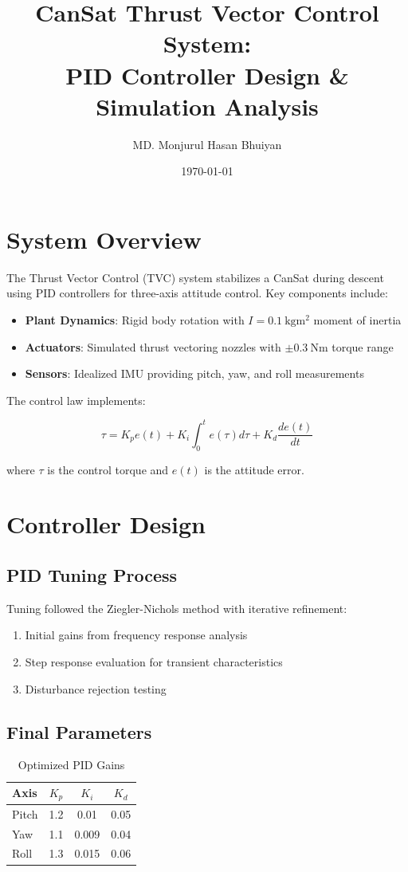 \documentclass[a4paper,12pt]{article}
\title{CanSat Thrust Vector Control System: \\ PID Controller Design \& Simulation Analysis}
\author{MD. Monjurul Hasan Bhuiyan}
\date{\today}
\begin{document}
\maketitle

\section{System Overview}
The Thrust Vector Control (TVC) system stabilizes a CanSat during descent using PID controllers for three-axis attitude control. Key components include:

\begin{itemize}
\item \textbf{Plant Dynamics}: Rigid body rotation with $I = \SI{0.1}{\kilo\gram\meter\squared}$ moment of inertia
\item \textbf{Actuators}: Simulated thrust vectoring nozzles with $\pm\SI{0.3}{\newton\meter}$ torque range
\item \textbf{Sensors}: Idealized IMU providing pitch, yaw, and roll measurements
\end{itemize}

The control law implements:

\begin{equation}
\tau = K_p e(t) + K_i \int_0^t e(\tau) d\tau + K_d \frac{de(t)}{dt}
\end{equation}

where $\tau$ is the control torque and $e(t)$ is the attitude error.

\section{Controller Design}
\subsection{PID Tuning Process}
Tuning followed the Ziegler-Nichols method with iterative refinement:

\begin{enumerate}
\item Initial gains from frequency response analysis
\item Step response evaluation for transient characteristics
\item Disturbance rejection testing
\end{enumerate}

\subsection{Final Parameters}
\begin{table}[h]
\centering
\caption{Optimized PID Gains}
\begin{tabular}{lccc}
\toprule
Axis & $K_p$ & $K_i$ & $K_d$ \\
\midrule
Pitch & 1.2 & 0.01 & 0.05 \\
Yaw & 1.1 & 0.009 & 0.04 \\
Roll & 1.3 & 0.015 & 0.06 \\
\bottomrule
\end{tabular}
\end{table}
\end{document}
